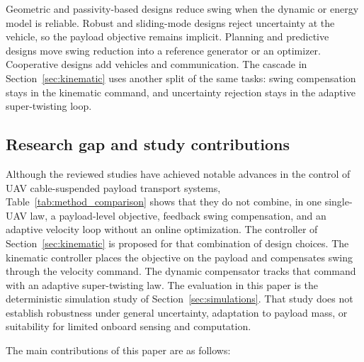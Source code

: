 \documentclass[sn-mathphys-num]{sn-jnl}
\theoremstyle{thmstyleone}%
\theoremstyle{thmstyletwo}%
\theoremstyle{thmstylethree}%
\begin{document}
Geometric and passivity-based designs reduce swing when the dynamic or energy model is reliable. Robust and sliding-mode designs reject uncertainty at the vehicle, so the payload objective remains implicit. Planning and predictive designs move swing reduction into a reference generator or an optimizer. Cooperative designs add vehicles and communication. The cascade in Section~\ref{sec:kinematic} uses another split of the same tasks: swing compensation stays in the kinematic command, and uncertainty rejection stays in the adaptive super-twisting loop.

\subsection{Research gap and study contributions}

Although the reviewed studies have achieved notable advances in the control of UAV cable-suspended payload transport systems, Table~\ref{tab:method_comparison} shows that they do not combine, in one single-UAV law, a payload-level objective, feedback swing compensation, and an adaptive velocity loop without an online optimization. The controller of Section~\ref{sec:kinematic} is proposed for that combination of design choices. The kinematic controller places the objective on the payload and compensates swing through the velocity command. The dynamic compensator tracks that command with an adaptive super-twisting law. The evaluation in this paper is the deterministic simulation study of Section~\ref{sec:simulations}. That study does not establish robustness under general uncertainty, adaptation to payload mass, or suitability for limited onboard sensing and computation.


The main contributions of this paper are as follows:
\end{document}
